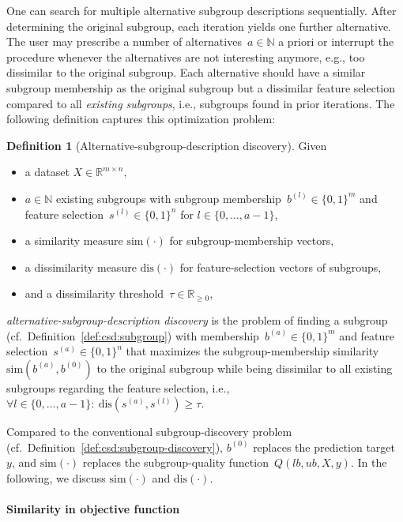 \documentclass{article}
\theoremstyle{definition}
\newtheorem{definition}{Definition}
\begin{document}
One can search for multiple alternative subgroup descriptions sequentially.
After determining the original subgroup, each iteration yields one further alternative.
The user may prescribe a number of alternatives~$a \in \mathbb{N}$ a priori or interrupt the procedure whenever the alternatives are not interesting anymore, e.g., too dissimilar to the original subgroup.
Each alternative should have a similar subgroup membership as the original subgroup but a dissimilar feature selection compared to all \emph{existing subgroups}, i.e., subgroups found in prior iterations.
The following definition captures this optimization problem:
%
\begin{definition}[Alternative-subgroup-description discovery]
	Given
	\begin{itemize}[noitemsep]
		\item a dataset $X \in \mathbb{R}^{m \times n}$,
		\item $a \in \mathbb{N}$ existing subgroups with subgroup membership~$b^{(l)} \in \{0, 1\}^m$ and feature selection~$s^{(l)} \in \{0, 1\}^n$ for $l \in \{0, \dots, a - 1\}$,
		\item a similarity measure $\text{sim}(\cdot)$ for subgroup-membership vectors,
		\item a dissimilarity measure $\text{dis}(\cdot)$ for feature-selection vectors of subgroups,
		\item and a dissimilarity threshold~$\tau \in \mathbb{R}_{\geq 0}$,
	\end{itemize}
	\emph{alternative-subgroup-description discovery} is the problem of finding a subgroup (cf.~Definition~\ref{def:csd:subgroup}) with membership~$b^{(a)} \in \{0, 1\}^m$ and feature selection~$s^{(a)} \in \{0, 1\}^n$ that maximizes the subgroup-membership similarity $\text{sim}(b^{(a)}, b^{(0)})$ to the original subgroup while being dissimilar to all existing subgroups regarding the feature selection, i.e., $\forall l \in \{0, \dots, a-1\}:~\text{dis}(s^{(a)}, s^{(l)}) \geq \tau$.
	\label{def:csd:alternative-subgroup-description-discovery}
\end{definition}
%
Compared to the conventional subgroup-discovery problem (cf.~Definition~\ref{def:csd:subgroup-discovery}), $b^{(0)}$ replaces the prediction target~$y$, and $\text{sim}(\cdot)$ replaces the subgroup-quality function~$Q(\mathit{lb}, \mathit{ub}, X, y)$.
In the following, we discuss $\text{sim}(\cdot)$ and $\text{dis}(\cdot)$.

\paragraph{Similarity in objective function}
\end{document}
